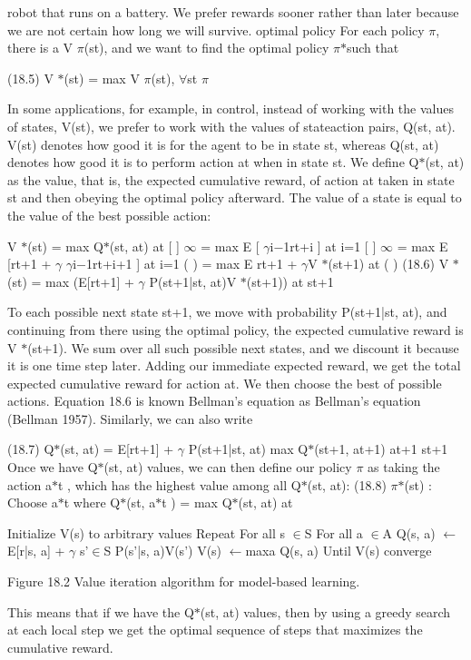 robot that runs on a battery. We prefer rewards sooner rather than later because we are not certain how long we will survive. optimal policy For each policy $\pi$, there is a V $\pi$(st), and we want to find the optimal policy $\pi$$*$such that

(18.5) V $*$(st) = max V $\pi$(st), $\forall$st $\pi$

In some applications, for example, in control, instead of working with the values of states, V(st), we prefer to work with the values of stateaction pairs, Q(st, at). V(st) denotes how good it is for the agent to be in state st, whereas Q(st, at) denotes how good it is to perform action at when in state st. We define Q$*$(st, at) as the value, that is, the expected cumulative reward, of action at taken in state st and then obeying the optimal policy afterward. The value of a state is equal to the value of the best possible action:

V $*$(st) = max Q$*$(st, at) at [ ] $\infty$ = max E [ $\gamma$i$-$1rt+i ] at i=1 [ ] $\infty$ = max E [rt+1 + $\gamma$ $\gamma$i$-$1rt+i+1 ] at i=1 ( ) = max E rt+1 + $\gamma$V $*$(st+1) at ( ) (18.6) V $*$(st) = max (E[rt+1] + $\gamma$ P(st+1|st, at)V $*$(st+1)) at st+1

To each possible next state st+1, we move with probability P(st+1|st, at), and continuing from there using the optimal policy, the expected cumulative reward is V $*$(st+1). We sum over all such possible next states, and we discount it because it is one time step later. Adding our immediate expected reward, we get the total expected cumulative reward for action at. We then choose the best of possible actions. Equation 18.6 is known Bellman’s equation as Bellman’s equation (Bellman 1957). Similarly, we can also write

(18.7) Q$*$(st, at) = E[rt+1] + $\gamma$ P(st+1|st, at) max Q$*$(st+1, at+1) at+1 st+1 Once we have Q$*$(st, at) values, we can then define our policy $\pi$ as taking the action a$*$t , which has the highest value among all Q$*$(st, at): (18.8) $\pi$$*$(st) : Choose a$*$t where Q$*$(st, a$*$t ) = max Q$*$(st, at) at

Initialize V(s) to arbitrary values Repeat For all s $\in$S For all a $\in$A Q(s, a) $\leftarrow$E[r|s, a] + $\gamma$ s'$\in$S P(s'|s, a)V(s') V(s) $\leftarrow$maxa Q(s, a) Until V(s) converge

Figure 18.2 Value iteration algorithm for model-based learning.

This means that if we have the Q$*$(st, at) values, then by using a greedy search at each local step we get the optimal sequence of steps that maximizes the cumulative reward.

